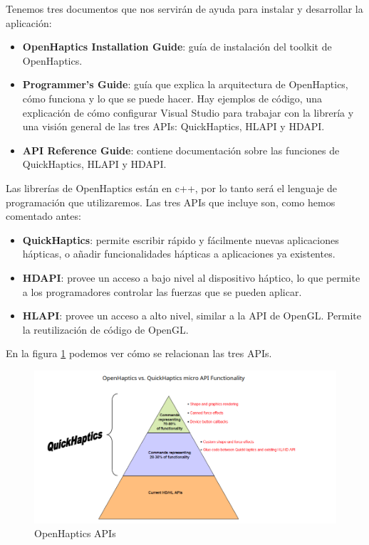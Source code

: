 \documentclass[a4paper,11pt, oneside]{book}
\begin{document}
Tenemos tres documentos que nos servirán de ayuda para instalar y desarrollar la aplicación:
\begin{itemize}
	\item \textbf{OpenHaptics Installation Guide}: guía de instalación del toolkit de OpenHaptics.
	\item \textbf{Programmer’s Guide}: guía que explica la arquitectura de OpenHaptics, cómo funciona y lo que se puede hacer. Hay ejemplos de código, una explicación de cómo configurar Visual Studio para trabajar con la librería y una visión general de las tres APIs: QuickHaptics, HLAPI y HDAPI.
	\item \textbf{API Reference Guide}: contiene documentación sobre las funciones de QuickHaptics, HLAPI y HDAPI.
\end{itemize}

Las librerías de OpenHaptics están en c++, por lo tanto será el lenguaje de programación que utilizaremos. Las tres APIs que incluye son, como hemos comentado antes:
\begin{itemize}
	\item \textbf{QuickHaptics}: permite escribir rápido y fácilmente nuevas aplicaciones hápticas, o añadir funcionalidades hápticas a aplicaciones ya existentes.  
	\item \textbf{HDAPI}: provee un acceso a bajo nivel al dispositivo háptico, lo que permite a los programadores controlar las fuerzas que se pueden aplicar. 
	\item \textbf{HLAPI}: provee un acceso a alto nivel, similar a la API de OpenGL. Permite la reutilización de código de OpenGL.
\end{itemize}
En la figura \ref{fig:apis} podemos ver cómo se relacionan las tres APIs.


\begin{figure}[H]
	
	\centering
	\includegraphics[width=1.1\linewidth]{OPENHAPTICS}
	\caption{OpenHaptics APIs \cite{guide}}
	\label{fig:apis}
	
\end{figure}
\end{document}
